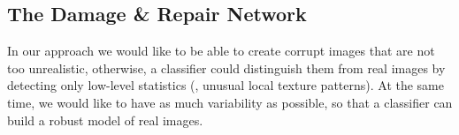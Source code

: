 \documentclass[10pt,twocolumn,letterpaper]{article}
\begin{document}

\subsection{The Damage \& Repair Network}
\label{sec:repair}
In our approach we would like to be able to create corrupt images that are not too unrealistic, otherwise, a classifier could distinguish them from real images by detecting only low-level statistics (\eg, unusual local texture patterns). At the same time, we would like to have as much variability as possible, so that a classifier can build a robust model of real images.
\end{document}
